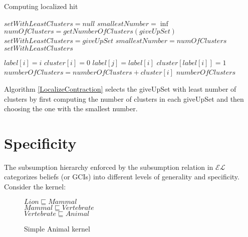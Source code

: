 \begin{algorithm}
\caption{Computing localized hit}
\label{LocalizeContraction}
\begin{algorithmic}[1]
\State $setWithLeastClusters = null$
\State $smallestNumber = \inf$
\State $numOfClusters = getNumberOfClusters(giveUpSet)$
\State $setWithLeastClusters = giveUpSet$
\State $smallestNumber = numOfClusters$
\EndIf
\EndFor
\State \Return $setWithLeastClusters$
\EndFunction
\end{algorithmic}


\begin{algorithmic}[1]
\State $label[i]=i$
\EndFor
{}
\State $cluster[i]=0$
\EndFor
{}
\State $label[j] = label[i]$
\EndIf
\EndFor
\EndFor
{}
\State $cluster[label[i]]=1$
\EndFor
{}
\State $numberOfClusters = numberOfClusters + cluster[i]$
\EndFor 
\State \Return $numberOfClusters$
\EndFunction
\end{algorithmic}
\end{algorithm}

Algorithm \ref{LocalizeContraction} selects the giveUpSet with least number of clusters by first computing the number of clusters in each giveUpSet and then choosing the one with the smallest number.

\section{Specificity}

The subsumption hierarchy enforced by the subsumption relation in $\mathcal{EL}$ categorizes beliefs (or GCIs) into different levels of generality and specificity. Consider the kernel:%
\begin{figure}[h]
\begin{center}
$Lion \sqsubseteq Mammal$\\
$Mammal \sqsubseteq Vertebrate$\\
$Vertebrate \sqsubseteq Animal$
\end{center}
\caption{Simple Animal kernel}
\label{fig:AnimalKernel}
\end{figure}

